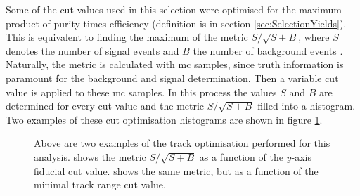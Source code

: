 Some of the cut values used in this selection were optimised for the maximum product of purity times efficiency (definition is in section \ref{sec:SelectionYields}). This is equivalent to finding the maximum of the metric $S/\sqrt{S+B}$, where $S$ denotes the number of signal events and $B$ the number of background events \cite{ProgressInNuMeasurements}. Naturally, the metric is calculated with \gls{mc} samples, since truth information is paramount for the background and signal determination. Then a variable cut value is applied to these \gls{mc} samples. In this process the values $S$ and $B$ are determined for every cut value and the metric $S/\sqrt{S+B}$ filled into a histogram. Two examples of these cut optimisation histograms are shown in figure \ref{fig:CutOptimisations}.
\begin{figure}[htbp]
    \centering
    \caption[Cut Optimisation Graphs]{Above are two examples of the track optimisation performed for this analysis.  shows the metric $S/\sqrt{S+B}$ as a function of the $y$-axis fiducial cut value.  shows the same metric, but as a function of the minimal track range cut value.}
    \label{fig:CutOptimisations}
\end{figure}
